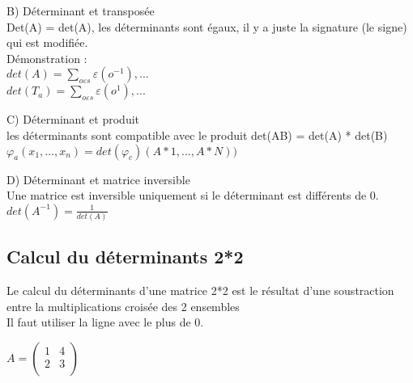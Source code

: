 \vspace{10mm} %
B) Déterminant et transposée \\

Det(A) = det(A), les déterminants sont égaux, il y a juste la signature (le signe) qui est modifiée.\\

Démonstration :\\

$det(A) = \sum_{o \varepsilon s} \varepsilon (o^{-1}), ...$\\

$det(T_{a}) = \sum_{o \varepsilon s} \varepsilon (o^{1}), ...$

\vspace{10mm} %
C) Déterminant et produit \\

les déterminants sont compatible avec le produit det(AB) = det(A) * det(B) \\

$
\varphi_{a} (x_{1}, ..., x_{n}) = det(\varphi_{c}) (A*1, ..., A*N))
$

\vspace{10mm} %
D) Déterminant et matrice inversible \\

Une matrice est inversible uniquement si le déterminant est différents de 0. \\

$
det(A^{-1}) = \frac{1}{det(A)}
$

\subsection{Calcul du déterminants 2*2}
\vspace{5mm} %
Le calcul du déterminants d'une matrice 2*2 est le résultat d'une soustraction entre la multiplications croisée des 2 ensembles \\
Il faut utiliser la ligne avec le plus de 0.

\vspace{5mm} %

$
A =
\begin{pmatrix}
  1 & 4 \\
  2 & 3 \\
\end{pmatrix}
$

\vspace{5mm} %

